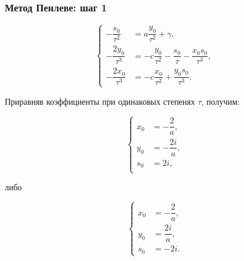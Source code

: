 \documentclass[hyperref={pdftex,unicode}]{beamer}
\begin{document}
\begin{frame}

\frametitle{Метод Пенлеве: шаг 1}

$$
        \left\{
                \begin{aligned}
                        -\dfrac{s_0}{\tau^2} &= a \dfrac{y_0}{\tau^2} + \gamma, \\
                        -\dfrac{2y_0}{\tau^3} &= -c \dfrac{y_0}{\tau^2} - \dfrac{s_0}{\tau} - \dfrac{x_0 s_0}{\tau^3}, \\
                        -\dfrac{2x_0}{\tau^{3}} &= -c \dfrac{x_0}{\tau^2} + \dfrac{y_0 s_0}{\tau^3}.
                \end{aligned}
        \right.
$$

\vspace{20pt}

Приравняв коэффициенты при одинаковых степенях $ \tau $, получим:

\vspace{10pt}

\begin{minipage}[h!]{0.4\linewidth}
$$
\left\{
\begin{aligned}
  x_0 &= - \dfrac{2}{a}, \\
  y_0 &= -\dfrac{2i}{a}, \\
  s_0 &= 2i, \\
\end{aligned}
\right.
$$
\end{minipage}
\hfill
либо
\hfill
\begin{minipage}[h!]{0.4\linewidth}
$$
\left\{
\begin{aligned}
  x_0 &= - \dfrac{2}{a}, \\
  y_0 &= \dfrac{2i}{a}, \\
  s_0 &= - 2i. 
\end{aligned}
\right.
$$
\end{minipage}


\end{frame}
\end{document}
